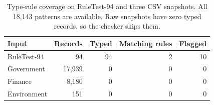 \begin{table}[t]
\centering
\caption{Type-rule coverage on RuleTest-94 and three CSV snapshots. All 18,143 patterns are available. Raw snapshots have zero typed records, so the checker skips them.}
\label{tab:rule_integration_coverage}
\footnotesize
\setlength{\tabcolsep}{3pt}
\begin{tabular*}{\textwidth}{@{\extracolsep{\fill}}lrrrr@{}}
\toprule
Input & Records & Typed & Matching rules & Flagged \\
\midrule
RuleTest-94 & 94 & 94 & 2 & 10 \\
Government & 17,939 & 0 & 0 & 0 \\
Finance & 8,180 & 0 & 0 & 0 \\
Environment & 151 & 0 & 0 & 0 \\
\bottomrule
\end{tabular*}
\end{table}

